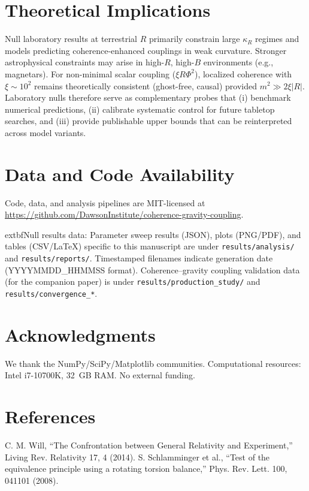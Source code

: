\documentclass[10pt,twocolumn]{article}
\begin{document}
\section{Theoretical Implications}
Null laboratory results at terrestrial $R$ primarily constrain large \(\kappa_R\) regimes and models predicting coherence-enhanced couplings in weak curvature. Stronger astrophysical constraints may arise in high-$R$, high-$B$ environments (e.g., magnetars). For non-minimal scalar coupling ($\xi R\Phi^2$), localized coherence with $\xi\sim10^2$ remains theoretically consistent (ghost-free, causal) provided $m^2\!\gg\!2\xi|R|$. Laboratory nulls therefore serve as complementary probes that (i) benchmark numerical predictions, (ii) calibrate systematic control for future tabletop searches, and (iii) provide publishable upper bounds that can be reinterpreted across model variants.

\section{Data and Code Availability}
Code, data, and analysis pipelines are MIT-licensed at\: \url{https://github.com/DawsonInstitute/coherence-gravity-coupling}. 

  extbf{Null results data:} Parameter sweep results (JSON), plots (PNG/PDF), and tables (CSV/LaTeX) specific to this manuscript are under \texttt{results/analysis/} and \texttt{results/reports/}. Timestamped filenames indicate generation date (YYYYMMDD\_HHMMSS format). Coherence--gravity coupling validation data (for the companion paper) is under \texttt{results/production\_study/} and \texttt{results/convergence\_*}.

\section*{Acknowledgments}
We thank the NumPy/SciPy/Matplotlib communities. Computational resources: Intel i7-10700K, 32~GB RAM. No external funding.

\section*{References}
\begin{thebibliography}{9}
 C. M. Will, ``The Confrontation between General Relativity and Experiment,'' Living Rev. Relativity 17, 4 (2014).
 S. Schlamminger et al., ``Test of the equivalence principle using a rotating torsion balance,'' Phys. Rev. Lett. 100, 041101 (2008).
\end{thebibliography}
\end{document}
